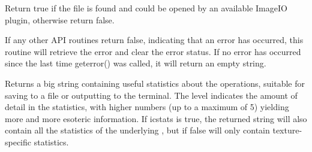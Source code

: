 Return true if the file is found and could be opened by an
available ImageIO plugin, otherwise return false.

\apiend


If any other API 
routines return {\cf false}, indicating that an
error has occurred, this routine will retrieve the error and clear
the error status.  If no error has occurred since the last time
{\cf geterror()} was called, it will return an empty string.
\apiend

Returns a big string containing useful statistics about the \ImageCache
operations, suitable for saving to a file or outputting to the terminal.
The {\cf level} indicates the amount of detail in the statistics,
with higher numbers (up to a maximum of 5) yielding more and more
esoteric information.  If {\cf icstats} is true, the returned string
will also contain all the statistics of the underlying \ImageCache,
but if false will only contain texture-specific statistics.
\apiend


\chapwidthend
